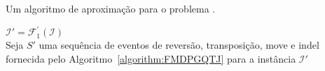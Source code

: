 \begin{algorithm}[!tbh]
  \caption{Um algoritmo de aproximação para o problema \SbFIRTMI{}.\label{algorithm:PJTWIANQ}}
  $\mathcal{I}' = \mathcal{F}_{1}^{'}(\mathcal{I})$ \\
  Seja $S'$ uma sequência de eventos de reversão, transposição, move e indel fornecida pelo Algoritmo~\ref{algorithm:FMDPGQTJ} para a instância $\mathcal{I}'$ \\
\end{algorithm}